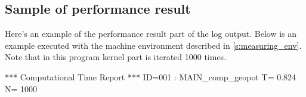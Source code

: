 \subsection{Sample of performance result}

Here's an example of the performance result part of the log output.
Below is an example executed with the machine environment described in \autoref{s:measuring_env}.
%
Note that in this program kernel part is iterated 1000 times.

\begin{LstLog}
 *** Computational Time Report
 *** ID=001 : MAIN_comp_geopot                 T=     0.824 N=   1000
\end{LstLog}
